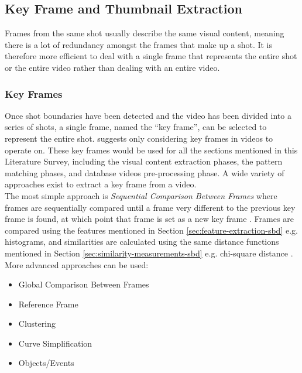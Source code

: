 
\subsection{Key Frame and Thumbnail Extraction}

Frames from the same shot usually describe the same visual content, meaning there is a lot of redundancy amongst the frames that make up a shot. It is therefore more efficient to deal with a single frame that represents the entire shot or the entire video rather than dealing with an entire video.

\subsubsection{Key Frames}

Once shot boundaries have been detected and the video has been divided into a series of shots, a single frame, named the ``key frame'', can be selected to represent the entire shot. \cite{heo2016colortransfer} suggests only considering key frames in videos to operate on. These key frames would be used for all the sections mentioned in this Literature Survey, including the visual content extraction phases, the pattern matching phases, and database videos pre-processing phase. A wide variety of approaches exist to extract a key frame from a video.\\

The most simple approach is \textit{Sequential Comparison Between Frames} where frames are sequentially compared until a frame very different to the previous key frame is found, at which point that frame is set as a new key frame \cite{heo2016colortransfer}. Frames are compared using the features mentioned in Section \ref{sec:feature-extraction-sbd} e.g. histograms, and similarities are calculated using the same distance functions mentioned in Section \ref{sec:similarity-measurements-sbd} e.g. chi-square distance \cite{hu2011survey}. More advanced approaches can be used:

\begin{itemize}
    \item Global Comparison Between Frames
    \item Reference Frame
    \item Clustering
    \item Curve Simplification
    \item Objects/Events
\end{itemize}


